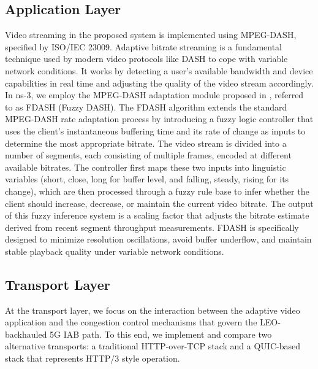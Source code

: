 \documentclass[journal]{IEEEtran}
\begin{document}
\subsection*{Application Layer}
Video streaming in the proposed system is implemented using MPEG-DASH, specified by ISO/IEC 23009. Adaptive bitrate streaming is a fundamental technique used by modern video protocols like DASH to cope with variable network conditions. It works by detecting a user's available bandwidth and device capabilities in real time and adjusting the quality of the video stream accordingly. In ns-3, we employ the MPEG-DASH adaptation module proposed in \cite{vergados2016fdash}, referred to as FDASH (Fuzzy DASH). The FDASH algorithm extends the standard MPEG-DASH rate adaptation process by introducing a fuzzy logic controller that uses the client’s instantaneous buffering time and its rate of change as inputs to determine the most appropriate bitrate. The video stream is divided into a number of segments, each consisting of multiple frames, encoded at different available bitrates. The controller first maps these two inputs into linguistic variables (short, close, long for buffer level, and falling, steady, rising for its change), which are then processed through a fuzzy rule base to infer whether the client should increase, decrease, or maintain the current video bitrate. The output of this fuzzy inference system is a scaling factor that adjusts the bitrate estimate derived from recent segment throughput measurements. FDASH is specifically designed to minimize resolution oscillations, avoid buffer underflow, and maintain stable playback quality under variable network conditions.
\subsection*{Transport Layer}

At the transport layer, we focus on the interaction between the adaptive video application and the congestion control mechanisms that govern the LEO-backhauled 5G IAB path. To this end, we implement and compare two alternative transports: a traditional HTTP-over-TCP stack and a QUIC-based stack that represents HTTP/3 style operation. 
\end{document}
